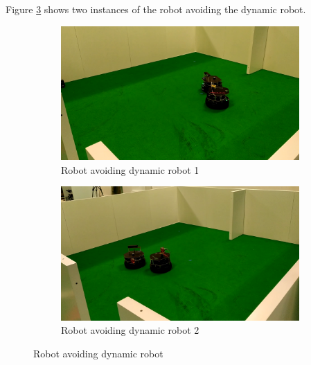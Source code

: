 Figure \ref{fig:exp3robot} shows two instances of the robot avoiding the dynamic robot.
\begin{figure}[ht!]
  \centering
  \begin{subfigure}[b]{0.49\linewidth}
    \includegraphics[width=\linewidth]{imgs/chapter5/exp3robot1.png}
     \caption{Robot avoiding dynamic robot 1}
     \label{fig::exp3robot1}
  \end{subfigure}
  \begin{subfigure}[b]{0.49\linewidth}
    \includegraphics[width=\linewidth]{imgs/chapter5/exp3robot2.png}
    \caption{Robot avoiding dynamic robot 2}
    \label{fig::exp3robot2}
  \end{subfigure}
  \caption{Robot avoiding dynamic robot }
  \label{fig:exp3robot}
\end{figure}

